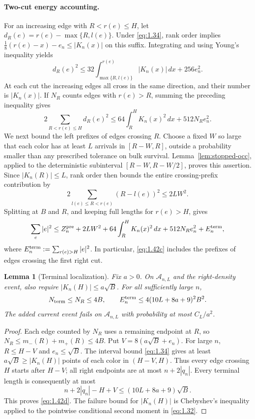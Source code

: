 \documentclass[11pt,reqno]{amsart}
\newtheorem{lemma}[theorem]{Lemma}
\theoremstyle{definition}
\theoremstyle{remark}
\numberwithin{equation}{section}
\begin{document}
\paragraph{Two-cut energy accounting.}
For an increasing edge with \(R<r(e)\le H\), let
\(d_R(e)=r(e)-\max\{R,l(e)\}\).  Under \eqref{eq:1.34}, rank order implies
\(\tfrac18(r(e)-x)-e_n\le|K_n(x)|\) on this suffix.  Integrating and
using Young's inequality yields
\[
d_R(e)^2\le32\int_{\max\{R,l(e)\}}^{r(e)}|K_n(x)|\,dx+256e_n^2.
\]
At each cut the increasing edges all cross in the same direction, and
their number is \(|K_n(x)|\).  If \(N_R\) counts edges with \(r(e)>R\),
summing the preceding inequality gives
\begin{equation}
2\sum_{R<r(e)\le H}d_R(e)^2
\le64\int_R^H K_n(x)^2\,dx+512N_R e_n^2.
\label{eq:1.42a}
\end{equation}
We next bound the left prefixes of edges crossing \(R\).
Choose a fixed \(W\) so large that each color has at least \(L\) arrivals
in \([R-W,R]\), outside a probability smaller than any prescribed tolerance
on bulk survival.  Lemma~\ref{lem:stopped-occ}, applied to the deterministic
subinterval \([R-W,R-W/2]\), proves this assertion.  Since
\(|K_n(R)|\le L\), rank order then bounds the entire crossing-prefix
contribution by
\begin{equation}
2\sum_{l(e)\le R<r(e)}(R-l(e))^2\le2LW^2.
\label{eq:1.42b}
\end{equation}
Splitting at \(B\) and \(R\), and keeping full lengths for \(r(e)>H\), gives
\begin{equation}
\sum_e|e|^2\le Z_n^{\rm pre}+2LW^2+
64\int_R^H K_n(x)^2\,dx+512N_R e_n^2+E_n^{\rm term},
\label{eq:1.42c}
\end{equation}
where \(E_n^{\rm term}:=\sum_{r(e)>H}|e|^2\).  In particular, \eqref{eq:1.42c}
includes the prefixes of edges crossing the first right cut.

\begin{lemma}[Terminal localization]
\label{lem:terminal-local}
Fix \(a>0\).  On \(\mathcal A_{n,L}\) and the right-density event, also
require \(|K_n(H)|\le a\sqrt B\).  For all sufficiently large \(n\),
\begin{equation}
N_{\rm term}\le N_R\le4B,\qquad
E_n^{\rm term}\le4(10L+8a+9)^2B^2.
\label{eq:1.42d}
\end{equation}
The added current event fails on \(\mathcal A_{n,L}\) with probability
at most \(C_L/a^2\).
\end{lemma}

\begin{proof}
Each edge counted by \(N_R\) uses a remaining endpoint at \(R\), so
\(N_R\le m_-(R)+m_+(R)\le4B\).  Put
\(V=8(a\sqrt B+e_n)\).  For large \(n\), \(R\le H-V\) and
\(e_n\le\sqrt B\).  The interval bound \eqref{eq:1.34} gives at least
\(a\sqrt B\ge|K_n(H)|\) points of each color in \((H-V,H)\).
Thus every edge crossing \(H\) starts after \(H-V\); all right endpoints
are at most \(n+2|q_n|\).  Every terminal length is consequently at most
\[
n+2|q_n|-H+V\le(10L+8a+9)\sqrt B.
\]
This proves \eqref{eq:1.42d}.  The failure bound for \(|K_n(H)|\) is Chebyshev's
inequality applied to the pointwise conditional second moment in \eqref{eq:1.32}.
\end{proof}
\end{document}
